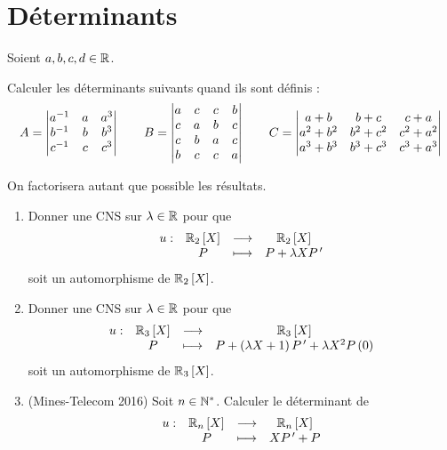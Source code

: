 \chapter{Déterminants}

\minitoc

\begin{exo}[Exercice 1]
Soient \(a,b,c,d\in\mathbb{R}\).

Calculer les déterminants suivants quand ils sont définis : \[A=\begin{vmatrix}
a^{-1} & a & a^3 \\
b^{-1} & b & b^3 \\
c^{-1} & c & c^3
\end{vmatrix}\qquad B=\begin{vmatrix}
a & c & c & b \\
c & a & b & c \\
c & b & a & c \\
b & c & c & a
\end{vmatrix}\qquad C=\begin{vmatrix}
a+b & b+c & c+a \\
a^2+b^2 & b^2+c^2 & c^2+a^2 \\
a^3+b^3 & b^3+c^3 & c^3+a^3
\end{vmatrix}\]

On factorisera autant que possible les résultats.
\end{exo}

\begin{corr}
\end{corr}

\begin{exo}[Exercice 2]
\begin{enumerate}
\item Donner une CNS sur \(\lambda\in\mathbb{R}\) pour que \[\fonction{u}{\polydeg[\R]{2}}{\polydeg[\R]{2}}{P}{P+\lambda XP\prim}\] soit un automorphisme de \(\polydeg[\R]{2}\). \\

\item Donner une CNS sur \(\lambda\in\mathbb{R}\) pour que \[\fonction{u}{\polydeg[\R]{3}}{\polydeg[\R]{3}}{P}{P+\paren{\lambda X+1}P\prim+\lambda X^2P\paren{0}}\] soit un automorphisme de \(\polydeg[\R]{3}\). \\

\item (Mines-Telecom 2016) Soit \(n\in\mathbb{N}^*\). Calculer le déterminant de \[\fonction{u}{\polydeg[\R]{n}}{\polydeg[\R]{n}}{P}{XP\prim+P}\]
\end{enumerate}
\end{exo}

